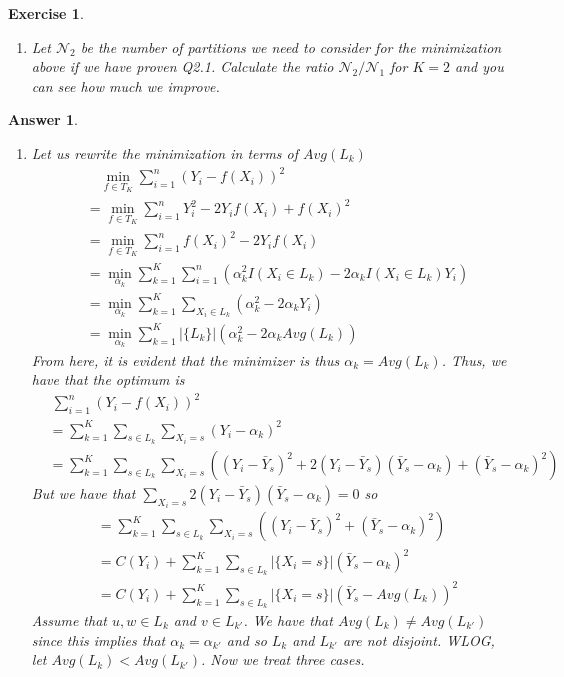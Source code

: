 \documentclass[12pt]{article}
\theoremstyle{colon}
\newtheorem{exercise}{Exercise}
\newtheorem*{answer}{Answer}
\begin{document}
\begin{exercise}
\begin{enumerate}[label=\arabic*)]
    \item Let $\mathcal{N}_2$ be the number of partitions we need to consider for the minimization above if we have proven Q2.1. Calculate the ratio $\mathcal{N}_2/\mathcal{N}_1$ for $K=2$ and you can see how much we improve.
  \end{enumerate}
\end{exercise}

\begin{answer}
  \leavevmode
  \begin{enumerate}[label=\arabic*)]
    \item Let us rewrite the minimization in terms of $Avg(L_k)$
      \begin{align*}
        &\quad \min_{f \in T_K} \sum_{i=1}^n (Y_i - f(X_i))^2 \\
        &= \min_{f \in T_K} \sum_{i=1}^n Y_i^2 - 2 Y_i f(X_i) + f(X_i)^2 \\
        &= \min_{f \in T_K} \sum_{i=1}^n f(X_i)^2 - 2 Y_i f(X_i) \\
        &= \min_{\alpha_k} \sum_{k=1}^K \sum_{i=1}^n \left( \alpha_k^2 I(X_i \in L_k) - 2 \alpha_k I(X_i \in L_k) Y_i \right) \\
        &= \min_{\alpha_k} \sum_{k=1}^K \sum_{X_i \in L_k} \left( \alpha_k^2 - 2 \alpha_k Y_i \right) \\
        &= \min_{\alpha_k} \sum_{k=1}^K \lvert \{L_k\} \rvert \left( \alpha_k^2 - 2 \alpha_k Avg(L_k) \right)
      \end{align*}
      From here, it is evident that the minimizer is thus $\alpha_k = Avg(L_k)$. Thus, we have that the optimum is
      \begin{align*}
        &\ \sum_{i=1}^n (Y_i - f(X_i))^2 \\
        &= \sum_{k=1}^K \sum_{s \in L_k} \sum_{X_i = s} (Y_i - \alpha_k)^2 \\
        &= \sum_{k=1}^K \sum_{s \in L_k} \sum_{X_i = s} \left((Y_i - \bar{Y}_s)^2 + 2(Y_i - \bar{Y}_s)(\bar{Y}_s - \alpha_k) + (\bar{Y}_s - \alpha_k)^2 \right)
      \end{align*}
      But we have that $\sum_{X_i = s} 2(Y_i - \bar{Y}_s)(\bar{Y}_s - \alpha_k) = 0$ so
      \begin{align*}
        &= \sum_{k=1}^K \sum_{s \in L_k} \sum_{X_i = s} \left((Y_i - \bar{Y}_s)^2 + (\bar{Y}_s - \alpha_k)^2 \right) \\
        &= C(Y_i) + \sum_{k=1}^K \sum_{s \in L_k} \lvert \{X_i = s \} \rvert (\bar{Y}_s - \alpha_k)^2 \\
        &= C(Y_i) + \sum_{k=1}^K \sum_{s \in L_k} \lvert \{X_i = s \} \rvert (\bar{Y}_s - Avg(L_k))^2
      \end{align*}
      Assume that $u,w \in L_k$ and $v \in L_{k'}$. We have that $Avg(L_k) \neq Avg(L_{k'})$ since this implies that $\alpha_k = \alpha_{k'}$ and so $L_k$ and $L_{k'}$ are not disjoint. WLOG, let $Avg(L_k) < Avg(L_{k'})$. Now we treat three cases.


\end{enumerate}
\end{answer}
\end{document}
